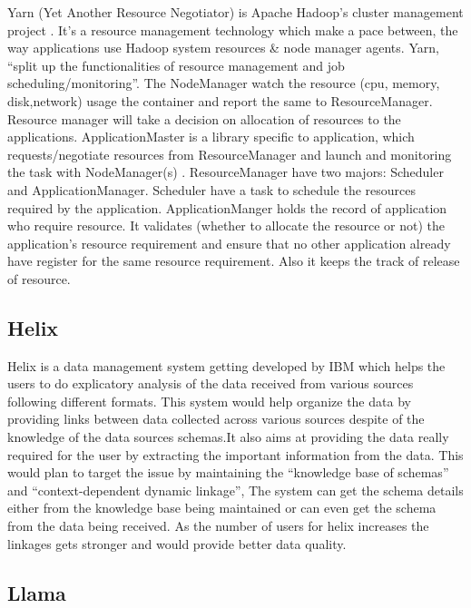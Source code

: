      Yarn (Yet Another Resource Negotiator) is Apache Hadoop’s cluster
     management project \cite{www-cloudera} . It’s a resource
     management technology which make a pace between, the way
     applications use Hadoop system resources \& node manager
     agents. Yarn, ``split up the functionalities of resource
     management and job scheduling/monitoring''. The NodeManager watch
     the resource (cpu, memory, disk,network) usage the container and
     report the same to ResourceManager. Resource manager will take a
     decision on allocation of resources to the
     applications. ApplicationMaster is a library specific to
     application, which requests/negotiate resources from
     ResourceManager and launch and monitoring the task with
     NodeManager(s) \cite{www-architecture}.  ResourceManager have
     two majors: Scheduler and ApplicationManager. Scheduler have a
     task to schedule the resources required by the
     application. ApplicationManger holds the record of application
     who require resource. It validates (whether to allocate the
     resource or not) the application’s resource requirement and
     ensure that no other application already have register for the
     same resource requirement. Also it keeps the track of release of
     resource. \cite{www-HadoopApache}

\subsection{Helix}

     Helix is a data management system getting developed by IBM which
     helps the users to do explicatory analysis of the data received
     from various sources following different formats. This system
     would help organize the data by providing links between data
     collected across various sources despite of the knowledge of the
     data sources schemas.It also aims at providing  the data really
     required for the user by extracting the important information
     from the data. This would plan to target the issue by
     maintaining the ``knowledge base of schemas'' and
     ``context-dependent dynamic linkage'', The system can get the
     schema details either from the  knowledge base being maintained
     or can even get the schema from the data being received. As the
     number of users for helix increases the linkages gets stronger
     and would provide better data
     quality. \cite{www-ibm-helix-paper}
      
\subsection{Llama}

